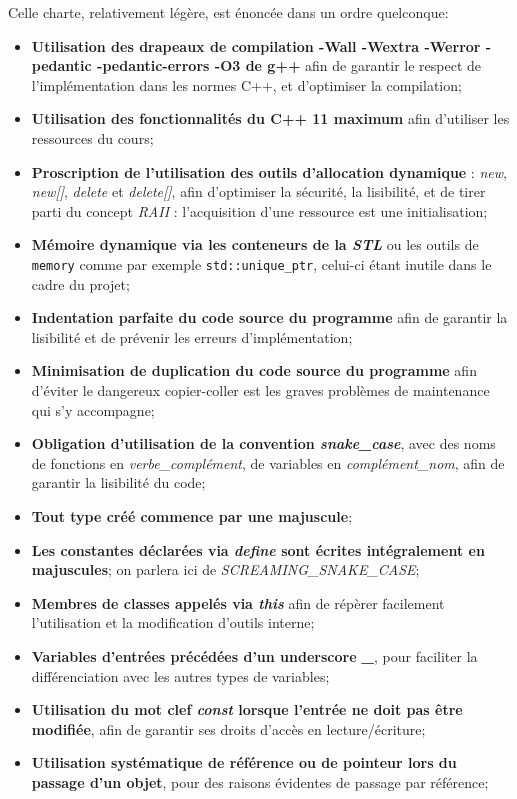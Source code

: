\documentclass[9pts]{article}
\begin{document}
Celle charte, relativement légère, est énoncée dans un ordre quelconque:
\begin{itemize}
\item \textbf{Utilisation des drapeaux de compilation -Wall -Wextra -Werror -pedantic -pedantic-errors -O3 de g++} afin de garantir le respect de l'implémentation dans les normes C++, et d'optimiser la compilation;
\item \textbf{Utilisation des fonctionnalités du C++ 11 maximum} afin d'utiliser les ressources du cours; %
\item \textbf{Proscription de l'utilisation des outils d'allocation dynamique} : \emph{new}, \emph{new[]}, \emph{delete} et \emph{delete[]}, afin d'optimiser la sécurité, la lisibilité, et de tirer parti du concept \emph{RAII} : l'acquisition d'une ressource est une initialisation;
\item \textbf{Mémoire dynamique via les conteneurs de la \emph{STL}} ou les outils de \texttt{memory} comme par exemple \texttt{std::unique\_ptr}, celui-ci étant inutile dans le cadre du projet;
\item \textbf{Indentation parfaite du code source du programme} afin de garantir la lisibilité et de prévenir les erreurs d'implémentation;
\item \textbf{Minimisation de duplication du code source du programme} afin d'éviter le dangereux copier-coller est les graves problèmes de maintenance qui s'y accompagne;
\item \textbf{Obligation d'utilisation de la convention \emph{snake\_case}}, avec des noms de fonctions en \emph{verbe\_complément}, de variables en \emph{complément\_nom}, afin de garantir la lisibilité du code;
\item \textbf{Tout type créé commence par une majuscule}; %
\item \textbf{Les constantes déclarées via \emph{define} sont écrites intégralement en majuscules}; on parlera ici de \emph{SCREAMING\_SNAKE\_CASE};
\item \textbf{Membres de classes appelés via \emph{this}} afin de répèrer facilement l'utilisation et la modification d'outils interne;
\item \textbf{Variables d'entrées précédées d'un underscore \emph{\_}}, pour faciliter la différenciation avec les autres types de variables;
\item \textbf{Utilisation du mot clef \emph{const} lorsque l'entrée ne doit pas être modifiée}, afin de garantir ses droits d'accès en lecture/écriture;
\item \textbf{Utilisation systématique de référence ou de pointeur lors du passage d'un objet}, pour des raisons évidentes de passage par référence;
\end{itemize}
\end{document}
